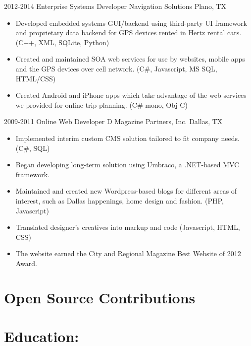 \documentclass{moderncv}
\begin{document}
	\cventry
	{2012-2014}
	{Enterprise Systems Developer}   
	{Navigation Solutions}
	{Plano, TX}{}
	{
		\begin{itemize}
			\item {Developed embedded systems GUI/backend using third-party UI framework and proprietary data backend for GPS devices rented in Hertz rental cars. (C++, XML, SQLite, Python)}
			\item {Created and maintained SOA web services for use by websites, mobile apps and the GPS devices over cell network. (C\#, Javascript, MS SQL, HTML/CSS)}
			\item {Created Android and iPhone apps which take advantage of the web services we provided for online trip planning. (C\# mono, Obj-C)}
		\end{itemize}
	}
	
	\cventry
	{2009-2011}
	{Online Web Developer}   
	{D Magazine Partners, Inc.}
	{Dallas, TX}{}
	{
		\begin{itemize}
			\item {Implemented interim custom CMS solution tailored to fit company needs. (C\#, SQL)}
			\item {Began developing long-term solution using Umbraco, a .NET-based MVC framework.}
			\item {Maintained and created new Wordpress-based blogs for different areas of interest, such as Dallas happenings, home design and fashion. (PHP, Javascript)}
			\item {Translated designer's creatives into markup and code (Javascript, HTML, CSS)}
			\item {The website earned the City and Regional Magazine Best Website of 2012 Award.}
		\end{itemize}
	}
	
	\section{Open Source Contributions}
	\section{Education:}
	
\end{document}
